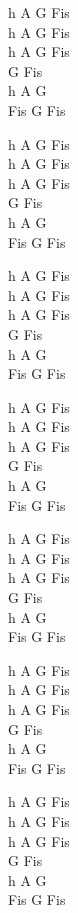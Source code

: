 \begin{chord}
\small{
    h A G Fis\\
    h A G Fis\\
    h A G Fis\\
    G Fis\\
    h A G\\
    Fis G Fis

    h A G Fis\\
    h A G Fis\\
    h A G Fis\\
    G Fis\\
    h A G\\
    Fis G Fis

    h A G Fis\\
    h A G Fis\\
    h A G Fis\\
    G Fis\\
    h A G\\
    Fis G Fis

    h A G Fis\\
    h A G Fis\\
    h A G Fis\\
    G Fis\\
    h A G\\
    Fis G Fis

    h A G Fis\\
    h A G Fis\\
    h A G Fis\\
    G Fis\\
    h A G\\
    Fis G Fis

    h A G Fis\\
    h A G Fis\\
    h A G Fis\\
    G Fis\\
    h A G\\
    Fis G Fis

    h A G Fis\\
    h A G Fis\\
    h A G Fis\\
    G Fis\\
    h A G\\
    Fis G Fis
}
\end{chord}